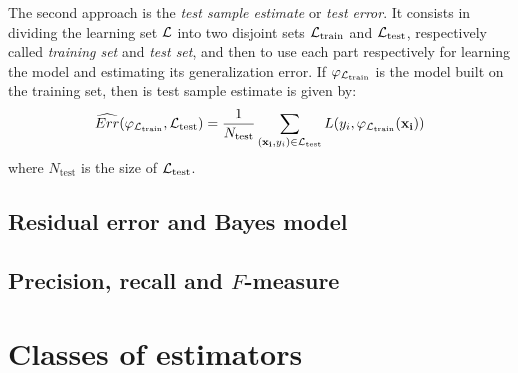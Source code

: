 The second approach is the \textit{test sample estimate} or \textit{test error}. It consists in
dividing the learning set ${\cal L}$ into two disjoint sets ${\cal
L}_\text{train}$ and ${\cal L}_\text{test}$, respectively called
\textit{training set} and \textit{test set}, and then to use each part
respectively for learning the model and estimating its generalization error. If
$\varphi_{{\cal L}_\text{train}}$ is the model built on the training set, then
is test sample estimate is given by:
\begin{equation}\label{eqn:test-error}
\widehat{Err}(\varphi_{{\cal L}_\text{train}}, {\cal L}_\text{test}) = \frac{1}{N_\text{test}} \sum_{(\mathbf{x_i}, y_i) \in {\cal L}_\text{test}} L(y_i, \varphi_{{\cal L}_\text{train}}(\mathbf{x_i}))
\end{equation}
where $N_\text{test}$ is the size of ${\cal L}_\text{test}$.


\subsection{Residual error and Bayes model}


\subsection{Precision, recall and $F$-measure}



\section{Classes of estimators}
